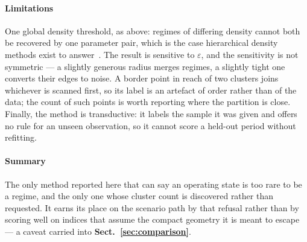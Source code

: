 \paragraph{Limitations}
\label{sec:tech:dbscan:limitations}
One global density threshold, as above: regimes of differing density
cannot both be recovered by one parameter pair, which is the case
hierarchical density methods exist to answer~\cite{ref_1}. The result is
sensitive to $\varepsilon$, and the sensitivity is not symmetric --- a
slightly generous radius merges regimes, a slightly tight one converts
their edges to noise. A border point in reach of two clusters joins
whichever is scanned first, so its label is an artefact of order rather
than of the data; the count of such points is worth reporting where the
partition is close. Finally, the method is transductive: it labels the
sample it was given and offers no rule for an unseen observation, so it
cannot score a held-out period without refitting.

\paragraph{Summary}
\label{sec:tech:dbscan:summary}
The only method reported here that can say an operating state is too rare
to be a regime, and the only one whose cluster count is discovered rather
than requested. It earns its place on the scenario path by that refusal
rather than by scoring well on indices that assume the compact geometry it
is meant to escape --- a caveat carried into
\textbf{Sect.~\ref{sec:comparison}}.

%
%
